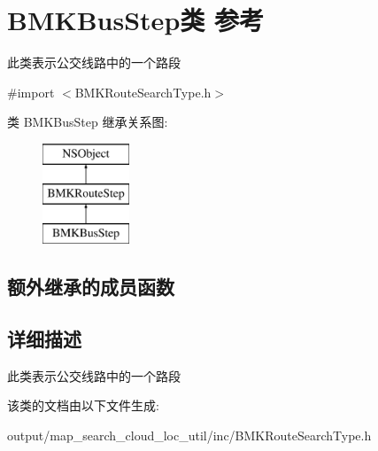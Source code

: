 \hypertarget{interface_b_m_k_bus_step}{\section{B\+M\+K\+Bus\+Step类 参考}
\label{interface_b_m_k_bus_step}
}


此类表示公交线路中的一个路段  




{\ttfamily \#import $<$B\+M\+K\+Route\+Search\+Type.\+h$>$}

类 B\+M\+K\+Bus\+Step 继承关系图\+:\begin{figure}[H]
\begin{center}
\leavevmode
\includegraphics[height=3.000000cm]{interface_b_m_k_bus_step}
\end{center}
\end{figure}
\subsection*{额外继承的成员函数}


\subsection{详细描述}
此类表示公交线路中的一个路段 

该类的文档由以下文件生成\+:\begin{DoxyCompactItemize}
\item 
output/map\+\_\+search\+\_\+cloud\+\_\+loc\+\_\+util/inc/B\+M\+K\+Route\+Search\+Type.\+h\end{DoxyCompactItemize}
